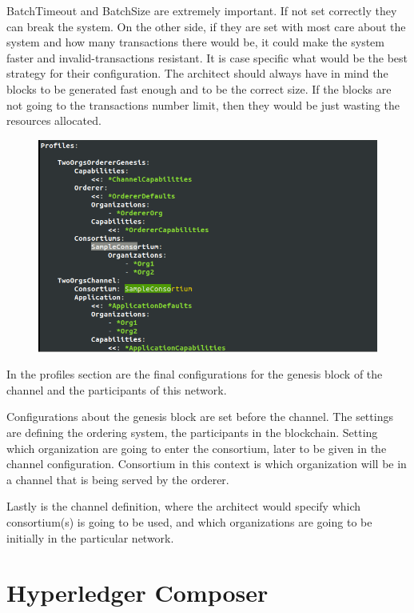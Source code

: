 \documentclass[a4paper,11pt]{report}
\begin{document}
	BatchTimeout and BatchSize are extremely important. If not set correctly they can break the system. On the other side, if they are set with most care about the system and how many transactions there would be, it could make the system faster and invalid-transactions resistant. It is case specific what would be the best strategy for their configuration. The architect should always have in mind the blocks to be generated fast enough and to be the correct size. If the blocks are not going to the transactions number limit, then they would be just wasting the resources allocated.  


\begin{figure}[h]
\centering
  \includegraphics[width = 16cm]{configtx3.png}
  \caption{}
  \label{configtx3}
\end{figure}

In the profiles section are the final configurations for the genesis block of the channel and the participants of this network. 

Configurations about the genesis block are set before the channel. The settings are defining the ordering system, the participants in the blockchain. Setting which organization are going to enter the consortium, later to be given in the channel configuration. Consortium in this context is which organization will be in a channel that is being served by the orderer. 

Lastly is the channel definition, where the architect would specify which consortium(s) is going to be used, and which organizations are going to be initially in the particular network.


\chapter{Hyperledger Composer}
\label{hplComposer}
\end{document}
